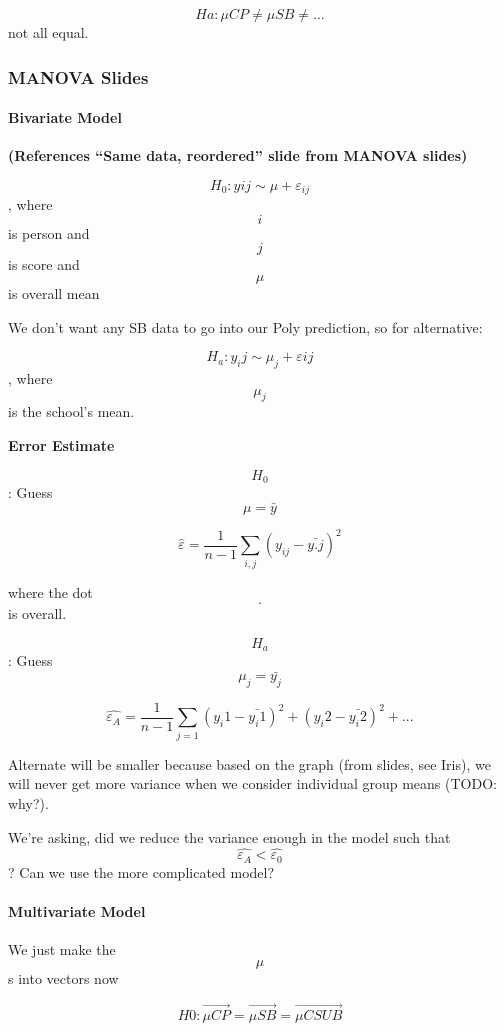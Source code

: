 \documentclass[]{article}
\let\oldparagraph\paragraph
\renewcommand{\paragraph}[1]{\oldparagraph{#1}\mbox{}}
\begin{document}
\[Ha: \mu{CP} \ne \mu{SB} \ne ... \] not all equal.

\hypertarget{manova-slides}{%
\subsubsection{MANOVA Slides}\label{manova-slides}}

\hypertarget{bivariate-model}{%
\paragraph{Bivariate Model}\label{bivariate-model}}

\textbf{(References ``Same data, reordered'' slide from MANOVA slides)}

\[H_0: y{ij} \sim \mu + \varepsilon_{ij}\], where \[i\] is person and
\[j\] is score and \[\mu\] is overall mean

We don't want any SB data to go into our Poly prediction, so for
alternative:

\[H_a: y_ij \sim \mu_j + \varepsilon{ij} \], where \[\mu_j\] is the
school's mean.

\textbf{Error Estimate}

\[H_0\]: Guess \[\mu = \bar{y}\]

\[\hat{\varepsilon} = \frac{1}{n-1} \sum_{i,j} (y_{ij} - \bar{y.j})^2\]

where the dot \[.\] is overall.

\[H_a\]: Guess \[\mu_j = \bar{y_j} \]

\[\hat{\varepsilon_A} = \frac{1}{n-1} \sum_{j = 1} (y_i1 - \bar{y_i1})^2 + (y_i2 - \bar{y_i2})^2 + ...\]

Alternate will be smaller because based on the graph (from slides, see
Iris), we will never get more variance when we consider individual group
means (TODO: why?).

We're asking, did we reduce the variance enough in the model such that
\[ \hat{\varepsilon_A} < \hat{\varepsilon_0} \]? Can we use the more
complicated model?

\hypertarget{multivariate-model}{%
\paragraph{Multivariate Model}\label{multivariate-model}}

We just make the \[ \mu \]s into vectors now

\[H0: \vec{\mu{CP}} = \vec{\mu{SB}} = \vec{\mu{CSU B}} \]
\end{document}
